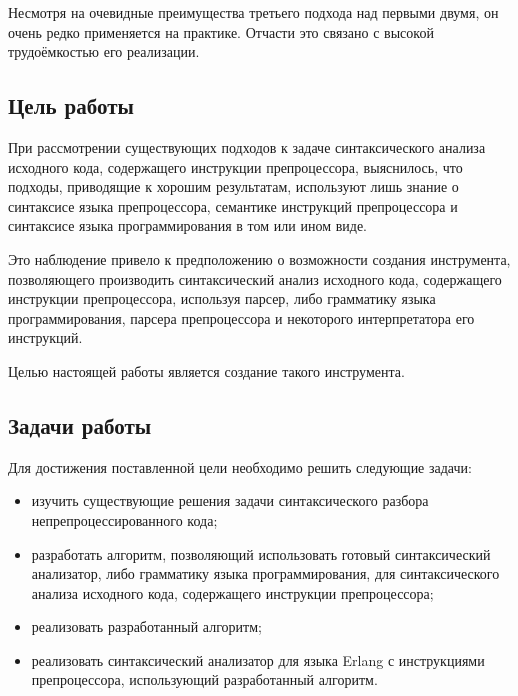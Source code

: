 Несмотря на очевидные преимущества третьего подхода над первыми двумя, он очень редко применяется на практике. Отчасти это связано с высокой трудоёмкостью его реализации.

\subsection{Цель работы}

При рассмотрении существующих подходов к задаче синтаксического анализа исходного кода, содержащего инструкции препроцессора, выяснилось, что подходы, приводящие к хорошим результатам, используют лишь знание о синтаксисе языка препроцессора, семантике инструкций препроцессора и синтаксисе языка программирования в том или ином виде.

Это наблюдение привело к предположению о возможности создания инструмента, позволяющего производить синтаксический анализ исходного кода, содержащего инструкции препроцессора, используя парсер, либо грамматику языка программирования, парсера препроцессора и некоторого интерпретатора его инструкций.

Целью настоящей работы является создание такого инструмента.

\subsection{Задачи работы}

Для достижения поставленной цели необходимо решить следующие задачи:

\begin{itemize}

\item изучить существующие решения задачи синтаксического разбора непрепроцессированного кода;

\item разработать алгоритм, позволяющий использовать готовый синтаксический анализатор, либо грамматику языка программирования, для синтаксического анализа исходного кода, содержащего инструкции препроцессора;

\item реализовать разработанный алгоритм;

\item реализовать синтаксический анализатор для языка Erlang с инструкциями препроцессора, использующий разработанный алгоритм.

\end{itemize}




